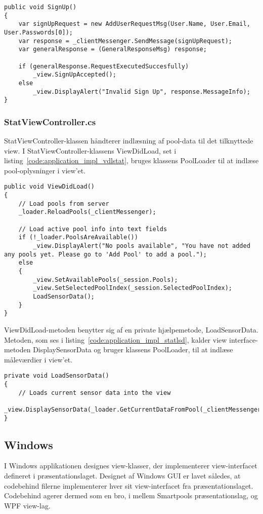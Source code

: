\begin{lstlisting}[caption={SignUp()},label={code:application_impl_signupmethod}]
public void SignUp()
{
	var signUpRequest = new AddUserRequestMsg(User.Name, User.Email, User.Passwords[0]);
	var response = _clientMessenger.SendMessage(signUpRequest);
	var generalResponse = (GeneralResponseMsg) response;

	if (generalResponse.RequestExecutedSuccesfully)
		_view.SignUpAccepted();
	else
		_view.DisplayAlert("Invalid Sign Up", response.MessageInfo);
}
\end{lstlisting}

\subsubsection{StatViewController.cs}
StatViewController-klassen håndterer indlæsning af pool-data til det tilknyttede view. I StatViewController-klassens ViewDidLoad, set i listing~\ref{code:application_impl_vdlstat}, bruges klassens PoolLoader til at indlæse pool-oplysninger i view'et.

\begin{lstlisting}[caption={ViewDidLoad() in StatViewController},label={code:application_impl_vdlstat}]
public void ViewDidLoad()
{
	// Load pools from server
	_loader.ReloadPools(_clientMessenger);

	// Load active pool info into text fields
	if (!_loader.PoolsAreAvailable())
		_view.DisplayAlert("No pools available", "You have not added any pools yet. Please go to 'Add Pool' to add a pool.");
	else
	{
		_view.SetAvailablePools(_session.Pools);
		_view.SetSelectedPoolIndex(_session.SelectedPoolIndex);
		LoadSensorData();
	}
}
\end{lstlisting}

ViewDidLoad-metoden benytter sig af en private hjælpemetode, LoadSensorData. Metoden, som ses i listing~\ref{code:application_impl_statlsd}, kalder view interface-metoden DisplaySensorData og bruger klassens PoolLoader, til at indlæse måleværdier i view'et.

\begin{lstlisting}[caption={LoadSensorData() in StatViewController},label={code:application_impl_statlsd}]
private void LoadSensorData()
{
	// Loads current sensor data into the view
	_view.DisplaySensorData(_loader.GetCurrentDataFromPool(_clientMessenger));
}
\end{lstlisting}

\subsection{Windows}
I Windows applikationen designes view-klasser, der implementerer view-interfacet defineret i præsentationslaget.
Designet af Windows GUI er lavet således, at codebehind filerne implementerer hver sit view-interfacet fra præsentationslaget. Codebehind agerer dermed som en bro, i mellem Smartpools præsentationslag, og WPF view-lag.

